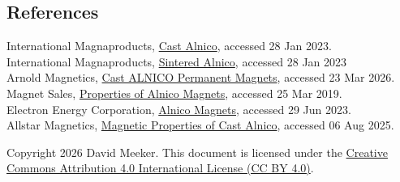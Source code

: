 \documentclass{article}
\begin{document}
\subsection*{References}
\noindent International Magnaproducts, \href{https://web.archive.org/web/20230128141918/https://magnetsim.com/materials/cast-alnico}{Cast Alnico}, accessed 28 Jan 2023. \\
\noindent International Magnaproducts, \href{https://web.archive.org/web/20230128123738/https://magnetsim.com/materials/sintered-alnico}{Sintered Alnico}, accessed 28 Jan 2023\\
\noindent Arnold Magnetics, \href{https://web.archive.org/web/20260323191135/https://www.arnoldmagnetics.com/wp-content/uploads/2017/10/Cast-Alnico-Permanent-Magnet-Brochure-101117.pdf}{Cast ALNICO Permanent Magnets}, accessed 23 Mar 2026. \\
\noindent Magnet Sales, \href{https://web.archive.org/web/20190325155903/http://www.magnetsales.com/Alnico/Alprops.htm}{Properties of Alnico Magnets}, accessed 25 Mar 2019. \\
\noindent Electron Energy Corporation, \href{https://web.archive.org/web/20230629103524/https://cdn2.hubspot.net/hubfs/4788906/Electronenergy_December2018/Docs/EEC-Alnico-Material-Sheet.pdf}{Alnico Magnets}, accessed 29 Jun 2023. \\
\noindent Allstar Magnetics, \href{https://web.archive.org/web/20250806020511/https://allstarmagnetics.com/wp-content/uploads/2024/09/Alnico-Technical-Data-ASM.pdf}{Magnetic Properties of Cast Alnico}, accessed 06 Aug 2025.

\noindent Copyright 2026 David Meeker. This document is licensed under the \href{https://creativecommons.org/licenses/by/4.0/}{Creative Commons Attribution 4.0 International License (CC BY 4.0)}.
\end{document}
